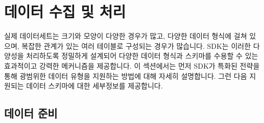 
\section{데이터 수집 및 처리}
\label{sec:data_ingestion}

실제 데이터세트는 크기와 모양이 다양한 경우가 많고, 다양한 데이터 형식에 걸쳐 있으며, 복잡한 관계가 있는 여러 테이블로 구성되는 경우가 많습니다.
SDK는 이러한 다양성을 처리하도록 정밀하게 설계되어 다양한 데이터 형식과 스키마를 수용할 수 있는 효과적이고 강력한 메커니즘을 제공합니다.
이 섹션에서는 먼저 SDK가 특화된 전략을 통해 광범위한 데이터 유형을 지원하는 방법에 대해 자세히 설명합니다.
그런 다음 지원되는 데이터 스키마에 대한 세부정보를 제공합니다.


\subsection{데이터 준비}
\label{subsec:data_encoding}




